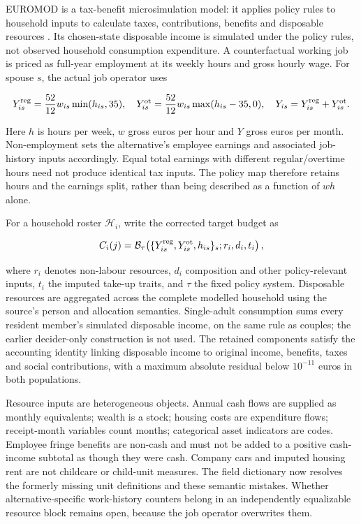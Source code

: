 \documentclass[11pt,a4paper]{article}
\begin{document}
EUROMOD is a tax-benefit microsimulation model: it applies policy rules to household inputs to calculate taxes, contributions, benefits and disposable resources \citep{sutherlandfigari2013}. Its chosen-state disposable income is simulated under the policy rules, not observed household consumption expenditure. A counterfactual working job is priced as full-year employment at its weekly hours and gross hourly wage. For spouse \(s\), the actual job operator uses

\[Y_{is}^{\rm reg}=\frac{52}{12}w_{is}\min(h_{is},35),\quad
Y_{is}^{\rm ot}=\frac{52}{12}w_{is}\max(h_{is}-35,0),\quad
Y_{is}=Y_{is}^{\rm reg}+Y_{is}^{\rm ot}.\]

Here \(h\) is hours per week, \(w\) gross euros per hour and \(Y\) gross euros per month. Non-employment sets the alternative's employee earnings and associated job-history inputs accordingly. Equal total earnings with different regular/overtime hours need not produce identical tax inputs. The policy map therefore retains hours and the earnings split, rather than being described as a function of \(wh\) alone.

For a household roster \(\mathcal H_i\), write the corrected target budget as

\[C_i(j)=\mathcal B_\tau\!\left(\{Y_{is}^{\rm reg},Y_{is}^{\rm ot},h_{is}\}_s;r_i,d_i,t_i\right),\]

where \(r_i\) denotes non-labour resources, \(d_i\) composition and other policy-relevant inputs, \(t_i\) the imputed take-up traits, and \(\tau\) the fixed policy system. Disposable resources are aggregated across the complete modelled household using the source's person and allocation semantics. Single-adult consumption sums every resident member's simulated disposable income, on the same rule as couples; the earlier decider-only construction is not used. The retained components satisfy the accounting identity linking disposable income to original income, benefits, taxes and social contributions, with a maximum absolute residual below \(10^{-11}\) euros in both populations.

Resource inputs are heterogeneous objects. Annual cash flows are supplied as monthly equivalents; wealth is a stock; housing costs are expenditure flows; receipt-month variables count months; categorical asset indicators are codes. Employee fringe benefits are non-cash and must not be added to a positive cash-income subtotal as though they were cash. Company cars and imputed housing rent are not childcare or child-unit measures. The field dictionary now resolves the formerly missing unit definitions and these semantic mistakes. Whether alternative-specific work-history counters belong in an independently equalizable resource block remains open, because the job operator overwrites them.
\end{document}

